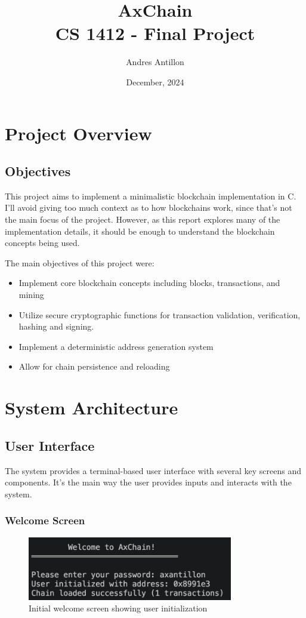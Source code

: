 \documentclass[12pt]{article}
\title{AxChain\\
\large CS 1412 - Final Project}
\author{Andres Antillon}
\date{December, 2024}
\begin{document}
\maketitle
\tableofcontents
\newpage

\section{Project Overview}
\subsection{Objectives}
This project aims to implement a minimalistic blockchain implementation in C. I'll avoid giving too much context as to how blockchains work, since that's not the main focus of the project. However, as this report explores many of the implementation details, it should be enough to understand the blockchain concepts being used.

The main objectives of this project were:
\begin{itemize}
    \item Implement core blockchain concepts including blocks, transactions, and mining
    \item Utilize secure cryptographic functions for transaction validation, verification, hashing and signing.
    \item Implement a deterministic address generation system
    \item Allow for chain persistence and reloading
\end{itemize}

\section{System Architecture}
\subsection{User Interface}
The system provides a terminal-based user interface with several key screens and components. It's the main way the user provides inputs and interacts with the system.

\subsubsection{Welcome Screen}
\begin{figure}[H]
\centering
\includegraphics[width=0.8\textwidth]{welcome_menu.png}
\caption{Initial welcome screen showing user initialization}
\end{figure}
\end{document}
